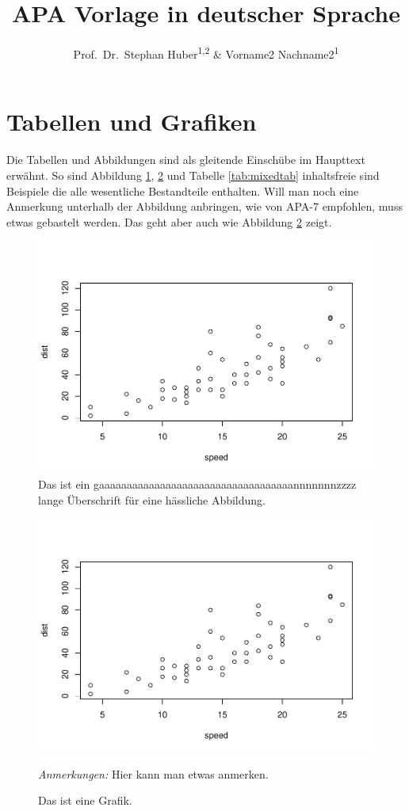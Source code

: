 \documentclass[
  doc]{apa7}
\title{APA Vorlage in deutscher Sprache}
\author{Prof.~Dr.~Stephan Huber\textsuperscript{1,2} \& Vorname2 Nachname2\textsuperscript{1}}
\date{}
\affiliation{\vspace{0.5cm}\textsuperscript{1} Fresenius University of Applied Science\\\textsuperscript{2} Charlotte Fresenius University}
\begin{document}
\maketitle

\hypertarget{tabellen-und-grafiken}{%
\section{Tabellen und Grafiken}\label{tabellen-und-grafiken}}

Die Tabellen und Abbildungen sind als gleitende Einschübe im Haupttext erwähnt. So sind Abbildung \ref{fig:plotcar}, \ref{fig:pressure} und Tabelle \ref{tab:mixedtab} inhaltsfreie sind Beispiele die alle wesentliche Bestandteile enthalten. Will man noch eine Anmerkung unterhalb der Abbildung anbringen, wie von APA-7 empfohlen, muss etwas gebastelt werden. Das geht aber auch wie Abbildung \ref{fig:pressure} zeigt.

\begin{figure}
\includegraphics[width=.5\textwidth]{apa7vorlage_files/figure-latex/plotcar-1} \caption{Das ist ein gaaaaaaaaaaaaaaaaaaaaaaaaaaaaaaaaaaannnnnnnzzzz lange Überschrift für eine hässliche Abbildung.}\label{fig:plotcar}
\end{figure}

\begin{figure}[t]

\includegraphics{apa7vorlage_files/figure-latex/pressure-1.pdf}

\caption{Das ist eine Grafik. \label{fig:pressure}}
\textit{Anmerkungen:} Hier kann man etwas anmerken.
\end{figure}
\end{document}

